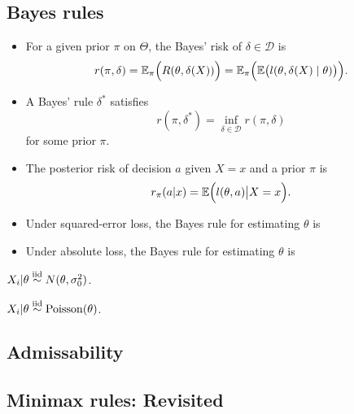 \subsection{Bayes rules}
\begin{mydef}\textbf{ }
	\begin{itemize}
		\item 
		For a given prior $\pi$ on $\Theta$, the Bayes' risk of $\delta \in \mathcal{D}$ is 
		$$r(\pi, \delta) = \mathbb{E}_\pi \Big( R(\theta, \delta(X)) \Big) =  \mathbb{E}_\pi \Big( \mathbb{E} \big( l(\theta, \delta(X)\mid \theta) \big) \Big).$$
		
		\item 
		A Bayes' rule $\delta^\ast$ satisfies
		$$r(\pi, \delta^\ast) = \inf_{\delta\in \mathcal{D}} r(\pi, \delta)$$
		for some prior $\pi$.
		
		\item 
		The posterior risk of decision $a$ given $X=x$ and a prior $\pi$ is  
		$$r_\pi(a|x) = \mathbb{E} \Big(  l(\theta,a) \big| X=x \Big).$$
	\end{itemize}
\end{mydef}

{\color{blue}
\begin{exap}
	\begin{itemize}
		\item Under squared-error loss, the Bayes rule for estimating $\theta$ is 
		
		\item Under absolute loss, the Bayes rule for estimating $\theta$ is 
	\end{itemize}
\end{exap}
}

\begin{exap}
	$X_i|\theta \stackrel{\text{iid}}{\sim} N(\theta, \sigma_0^2)$.
\end{exap}

\begin{exap}
	$X_i|\theta \stackrel{\text{iid}}{\sim} \mathrm{Poisson}(\theta)$.
\end{exap}

\subsection{Admissability}

\subsection{Minimax rules: Revisited}